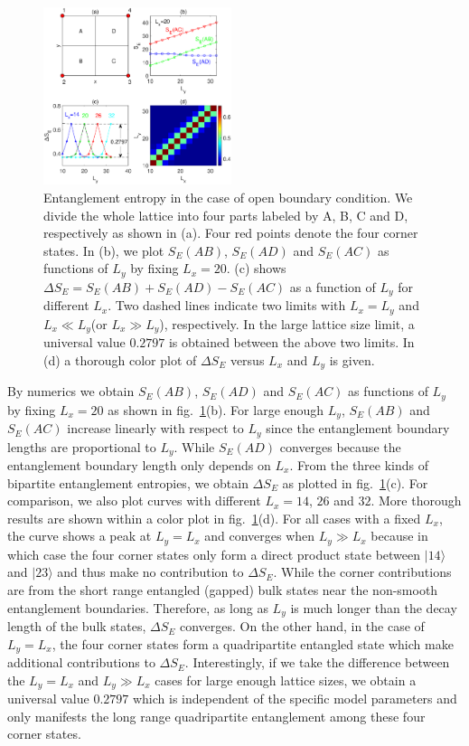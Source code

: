 \documentclass[doublecol]{epl2} %
\begin{document}
\begin{figure}
	\includegraphics[width=0.49\textwidth]{quadripartite.eps}
	\caption{\label{fig:quadripartite} Entanglement entropy in the case of open boundary condition. We divide the whole lattice into four parts labeled by A, B, C and D, respectively as shown in (a). Four red points denote the four corner states. In (b), we plot $S_E(AB)$, $S_E(AD)$ and $S_E(AC)$ as functions of $L_y$ by fixing $L_x=20$. (c) shows $\Delta S_E=S_E(AB)+S_E(AD)-S_E(AC)$ as a function of $L_y$ for different $L_x$. Two dashed lines indicate two limits with $L_x=L_y$ and $L_x\ll L_y$(or $L_x\gg L_y$), respectively. In the large lattice size limit, a universal value $0.2797$ is obtained between the above two limits. In (d) a thorough color plot of $\Delta S_E$ versus $L_x$ and $L_y$ is given.}
\end{figure}

By numerics we obtain $S_E(AB)$, $S_E(AD)$ and $S_E(AC)$ as functions of $L_y$ by fixing $L_x=20$ as shown in fig.~\ref{fig:quadripartite}(b). For large enough $L_y$, $S_E(AB)$ and $S_E(AC)$ increase linearly with respect to $L_y$ since the entanglement boundary lengths are proportional to $L_y$. While $S_E(AD)$ converges because the entanglement boundary length only depends on $L_x$. From the three kinds of bipartite entanglement entropies, we obtain $\Delta S_E$ as plotted in fig.~\ref{fig:quadripartite}(c). For comparison, we also plot curves with different $L_x=14$, $26$ and $32$. More thorough results are shown within a color plot in fig.~\ref{fig:quadripartite}(d). For all cases with a fixed $L_x$, the curve shows a peak at $L_y=L_x$ and converges when $L_y\gg L_x$ because in which case the four corner states only form a direct product state between $|14\rangle$ and $|23\rangle$ and thus make no contribution to $\Delta S_E$. While the corner contributions are from the short range entangled (gapped) bulk states near the non-smooth entanglement boundaries. Therefore, as long as $L_y$ is much longer than the decay length of the bulk states, $\Delta S_E$ converges. On the other hand, in the case of $L_y=L_x$, the four corner states form a quadripartite entangled state which make additional contributions to $\Delta S_E$. Interestingly, if we take the difference between the $L_y=L_x$ and $L_y\gg L_x$ cases for large enough lattice sizes, we obtain a universal value $0.2797$ which is independent of the specific model parameters and only manifests the long range quadripartite entanglement among these four corner states.
\end{document}
